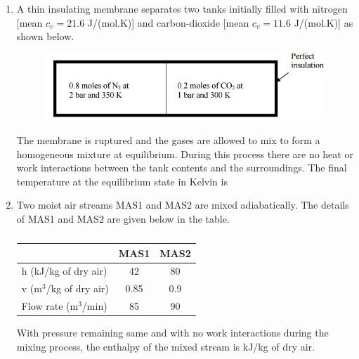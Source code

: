 \documentclass[a4paper,10pt]{article}
\begin{document}
\begin{enumerate}
    \item A thin insulating membrane separates two tanks initially filled with nitrogen [mean $c_v = 21.6$ J/(mol.K)] and carbon-dioxide [mean $c_v = 11.6$ J/(mol.K)] as shown below.
    \begin{figure}[H] \centering \includegraphics[width=0.7\columnwidth]{q20_thermo.png} \caption*{} \label{fig:q20_thermo} \end{figure}
    The membrane is ruptured and the gases are allowed to mix to form a homogeneous mixture at equilibrium. During this process there are no heat or work interactions between the tank contents and the surroundings. The final temperature at the equilibrium state in Kelvin is
    
    \hfill{}
    \begin{enumerate}[label=\Alph*)]
    \end{enumerate}

    \item Two moist air streams MAS1 and MAS2 are mixed adiabatically. The details of MAS1 and MAS2 are given below in the table.
    \begin{table}[h!] \centering \caption*{} \label{tab:q21_thermo}
        \begin{tabular}{|l|c|c|} \hline
            & MAS1 & MAS2 \\ \hline
            h (kJ/kg of dry air) & 42 & 80 \\ \hline
            v (m$^3$/kg of dry air) & 0.85 & 0.9 \\ \hline
            Flow rate (m$^3$/min) & 85 & 90 \\ \hline
        \end{tabular}
    \end{table}
    With pressure remaining same and with no work interactions during the mixing process, the enthalpy of the mixed stream is \underline{\hspace{2cm}} kJ/kg of dry air.
    

\end{enumerate}
\end{document}
